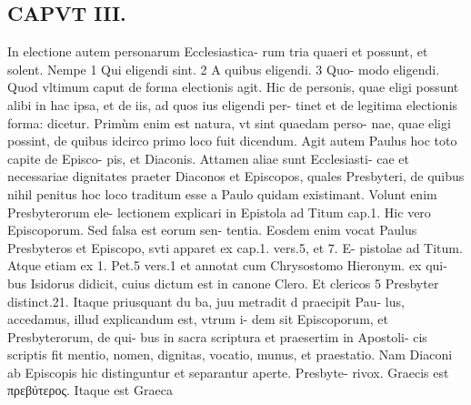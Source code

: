 \documentclass{article}
\begin{document}
\begin{pages}
\section*{CAPVT  III. }
\marginpar{[ p.85 ]}\pstart In electione autem personarum Ecclesiastica- rum tria quaeri et possunt, et solent. Nempe 1 Qui eligendi sint. 2 A quibus eligendi. 3 Quo- modo eligendi. Quod vltimum caput de forma electionis agit. Hic de personis, quae eligi possunt alibi in hac ipsa, et de iis, ad quos ius eligendi per- tinet et de legitima electionis forma: dicetur. Primùm enim est natura, vt sint quaedam perso- nae, quae eligi possint, de quibus idcirco primo loco fuit dicendum.  \pend\pstart Agit autem Paulus hoc toto capite de Episco- pis, et Diaconis. Attamen aliae sunt Ecclesiasti- cae et necessariae dignitates praeter Diaconos et Episcopos, quales Presbyteri, de quibus nihil penitus hoc loco traditum esse a Paulo quidam existimant. Volunt enim Presbyterorum ele- lectionem explicari in Epistola ad Titum cap.1. Hic vero Episcoporum. Sed falsa est eorum sen- tentia. Eosdem enim vocat Paulus Presbyteros et Episcopo, svti apparet ex cap.1. vers.5, et 7. E- pistolae ad Titum. Atque etiam ex 1. Pet.5 vers.1 et annotat cum Chrysostomo Hieronym. ex qui- bus Isidorus didicit, cuius dictum est in canone Clero. Et clericos 5 Presbyter distinct.21. Itaque priusquant du ba, juu metradit d praecipit Pau- lus, accedamus, illud explicandum est, vtrum i- dem sit Episcoporum, et Presbyterorum, de qui- bus in sacra scriptura et praesertim in Apostoli- cis scriptis fit mentio, nomen, dignitas, vocatio, munus, et praestatio. Nam Diaconi ab Episcopis hic distinguntur et separantur aperte. Presbyte- rivox. Graecis est πρεβύτερος. Itaque est Graeca  \pend

\end{pages}
\end{document}
